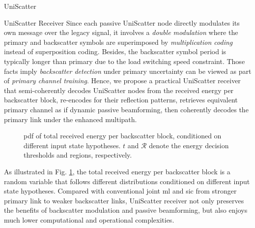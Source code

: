 \documentclass[journal]{IEEEtran}
\begin{document}
\begin{section}{UniScatter}
	\begin{subsection}{UniScatter Receiver}
		Since each passive UniScatter node directly modulates its own message over the legacy signal, it involves a \emph{double modulation} where the primary and backscatter symbols are superimposed by \emph{multiplication coding} instead of superposition coding.
		Besides, the backscatter symbol period is typically longer than primary due to the load switching speed constraint.
		Those facts imply \emph{backscatter detection} under primary uncertainty can be viewed as part of \emph{primary channel training}.
		Hence, we propose a practical UniScatter receiver that semi-coherently decodes UniScatter nodes from the received energy per backscatter block, re-encodes for their reflection patterns, retrieves equivalent primary channel as if dynamic passive beamforming, then coherently decodes the primary link under the enhanced multipath.
		\begin{figure}[!t]
			\centering
			\resizebox{0.9\columnwidth}{!}{
				
			}
			\caption{
				\gls{pdf} of total received energy per backscatter block, conditioned on different input state hypotheses.
				$t$ and $\mathcal{R}$ denote the energy decision thresholds and regions, respectively.
			}
			\label{fi:energy_distribution}
		\end{figure}
		As illustrated in Fig. \ref{fi:energy_distribution}, the total received energy per backscatter block is a random variable that follows different distributions conditioned on different input state hypotheses.
		Compared with conventional joint \gls{ml} and \gls{sic} from stronger primary link to weaker backscatter links, UniScatter receiver not only preserves the benefits of backscatter modulation and passive beamforming, but also enjoys much lower computational and operational complexities.
	\end{subsection}


\end{section}
\end{document}
